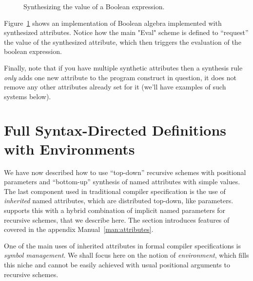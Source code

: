 \documentclass[11pt]{article} %
\begin{document}
\begin{figure}[p]
  \caption{Synthesizing the value of a Boolean expression.}
  \label{fig:bool}
\end{figure}

\begin{example}\label{ex:bool}
  Figure~\ref{fig:bool} shows an implementation of Boolean algebra implemented with synthesized
  attributes. Notice how the main "Eval" scheme is defined to ``request'' the value of the
  synthesized attribute, which then triggers the evaluation of the boolean expression.
\end{example}

Finally, note that if you have multiple synthetic attributes then a synthesis rule \emph{only} adds
one new attribute to the program construct in question, it does not remove any other attributes
already set for it (we'll have examples of such systems below).


\section{Full Syntax-Directed Definitions with Environments}
\label{sec:sdd}

We have now described how to use ``top-down'' recursive schemes with positional parameters and
``bottom-up'' synthesis of named attributes with simple values. The last component used in
traditional compiler specification is the use of \emph{inherited} named attributes, which are
distributed top-down, like parameters. \HAX supports this with a hybrid combination of implicit
named parameters for recursive schemes, that we describe here. The section introduces features of
\HAX covered in the appendix Manual~\ref{man:attributes}.

One of the main uses of inherited attributes in formal compiler specifications is \emph{symbol
  management}. We shall focus here on the \HAX notion of \emph{environment}, which fills this niche
and cannot be easily achieved with usual positional arguments to recursive schemes.
\end{document}
